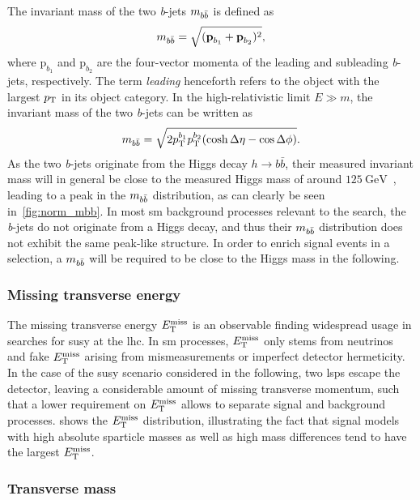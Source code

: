 The invariant mass of the two \textit{b}-jets $m_{b\bar{b}}$ is defined as
\begin{equation}
	m_{b\bar{b}} = \sqrt{(\boldsymbol{\mathrm{p}}_{b_1}+\boldsymbol{\mathrm{p}}_{b_2})^2},
\end{equation}
where $\boldsymbol{\mathrm{p}}_{b_1}$ and $\boldsymbol{\mathrm{p}}_{b_2}$ are the four-vector momenta of the leading and subleading \textit{b}-jets, respectively. The term \textit{leading} henceforth refers to the object with the largest $p_{\textrm{T}}$ in its object category. In the high-relativistic limit $E \gg m$, the invariant mass of the two \textit{b}-jets can be written as
\begin{equation}
	m_{b\bar{b}} = \sqrt{2p_{\textrm{T}}^{b_1}p_{\textrm{T}}^{b_2}(\cosh\Delta\eta - \cos\Delta\phi)}.
\end{equation}
As the two \textit{b}-jets originate from the Higgs decay $h\rightarrow b\bar{b}$, their measured invariant mass will in general be close to the measured Higgs mass of around $\SI{125}{\GeV}$~\cite{pdg2020}, leading to a peak in the $m_{b\bar{b}}$ distribution, as can clearly be seen in~\cref{fig:norm_mbb}. In most \gls{sm} background processes relevant to the search, the \textit{b}-jets do not originate from a Higgs decay, and thus their $m_{b\bar{b}}$ distribution does not exhibit the same peak-like structure. In order to enrich signal events in a selection, a $m_{b\bar{b}}$ will be required to be close to the Higgs mass in the following.

\subsubsection{Missing transverse energy}

The missing transverse energy $E_{\textrm{T}}^{\textrm{miss}}$ is an observable finding widespread usage in searches for \gls{susy} at the \gls{lhc}. In \gls{sm} processes, $E_{\textrm{T}}^{\textrm{miss}}$ only stems from neutrinos and fake $E_{\textrm{T}}^{\textrm{miss}}$ arising \eg from mismeasurements or imperfect detector hermeticity. In the case of the \gls{susy} scenario considered in the following, two \glspl{lsp} escape the detector, leaving a considerable amount of missing transverse momentum, such that a lower requirement on $E_{\textrm{T}}^{\textrm{miss}}$ allows to separate signal and background processes.  shows the $E_{\textrm{T}}^{\textrm{miss}}$ distribution, illustrating the fact that signal models with high absolute sparticle masses as well as high mass differences tend to have the largest $E_{\textrm{T}}^{\textrm{miss}}$.  

\subsubsection{Transverse mass}

